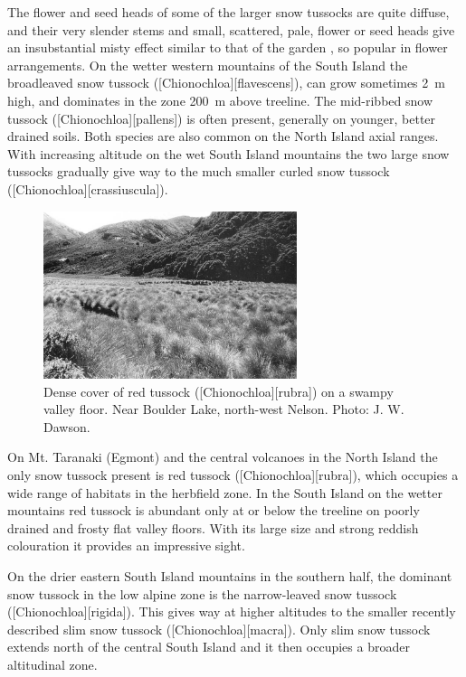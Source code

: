 The flower and seed heads of some of the larger snow tussocks are quite diffuse, and their very slender stems and small, scattered, pale, flower or seed heads give an insubstantial misty effect similar to that of the garden , so popular in flower arrangements.
On the wetter western mountains of the South Island the broadleaved snow tussock ([Chionochloa][flavescens]), can grow sometimes \SI{2}{\metre} high, and dominates in the zone \SI{200}{\metre} above treeline.
The mid-ribbed snow tussock ([Chionochloa][pallens]) is often present, generally on younger, better drained soils.
Both species are also common on the North Island axial ranges.
With increasing altitude on the wet South Island mountains the two large snow tussocks gradually give way to the much smaller curled snow tussock ([Chionochloa][crassiuscula]).

\begin{figure}
	\includegraphics[width=0.66\textwidth]{graphics/figure97red-tussock.jpg}
	\centering
	\caption[Red tussock]{Dense cover of red tussock ([Chionochloa][rubra]) on a swampy valley floor.
	Near Boulder Lake, north-west Nelson.
	Photo: J. W. Dawson.}%
	\label{fig:97red-tussock}
\end{figure}

On Mt. Taranaki (Egmont) and the central volcanoes in the North Island the only snow tussock present is red tussock ([Chionochloa][rubra]), which occupies a wide range of habitats in the herbfield zone.
In the South Island on the wetter mountains red tussock is abundant only at or below the treeline on poorly drained and frosty flat valley floors.
With its large size and strong reddish colouration it provides an impressive sight.

On the drier eastern South Island mountains in the southern half, the dominant snow tussock in the low alpine zone is the narrow-leaved snow tussock ([Chionochloa][rigida]).
This gives way at higher altitudes to the smaller recently described slim snow tussock ([Chionochloa][macra]).
Only slim snow tussock extends north of the central South Island and it then occupies a broader altitudinal zone.

